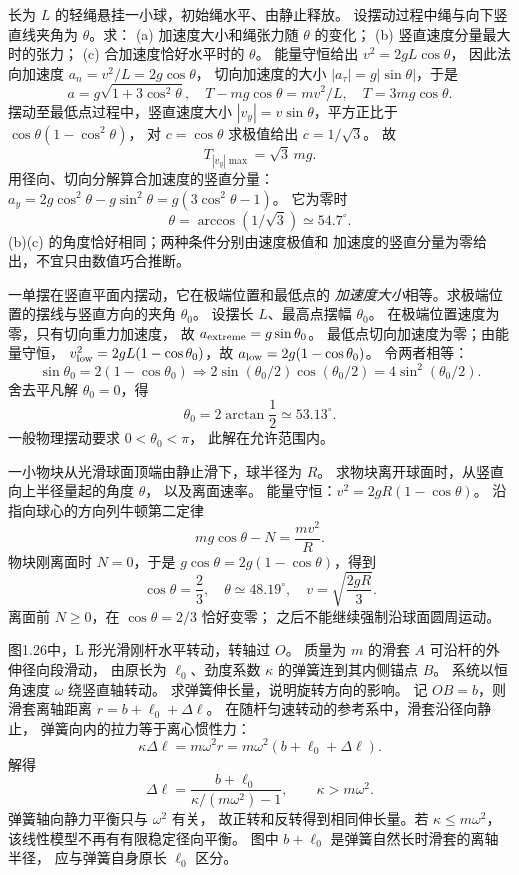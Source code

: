 长为 $L$ 的轻绳悬挂一小球，初始绳水平、由静止释放。
设摆动过程中绳与向下竖直线夹角为 $\theta$。求：
(a) 加速度大小和绳张力随 $\theta$ 的变化；
(b) 竖直速度分量最大时的张力；
(c) 合加速度恰好水平时的 $\theta$。
\exsolution
能量守恒给出 $v^2=2gL\cos\theta$，
因此法向加速度 $a_n=v^2/L=2g\cos\theta$，
切向加速度的大小 $|a_\tau|=g|\sin\theta|$，于是
\[
\boxed{a=g\sqrt{1+3\cos^2\theta},\quad
T-mg\cos\theta=mv^2/L,\quad T=3mg\cos\theta.}
\]
摆动至最低点过程中，竖直速度大小
$|v_y|=v\sin\theta$，平方正比于
$\cos\theta(1-\cos^2\theta)$，
对 $c=\cos\theta$ 求极值给出 $c=1/\sqrt3$。
故
\[
\boxed{T_{|v_y|\max}=\sqrt3\,mg}.
\]
用径向、切向分解算合加速度的竖直分量：
$a_y=2g\cos^2\theta-g\sin^2\theta
=g(3\cos^2\theta-1)$。
它为零时
\[
\boxed{\theta=\arccos(1/\sqrt3)\simeq54.7^\circ}.
\]
\excheck (b)(c) 的角度恰好相同；两种条件分别由速度极值和
加速度的竖直分量为零给出，不宜只由数值巧合推断。

一单摆在竖直平面内摆动，它在极端位置和最低点的
\emph{加速度大小}相等。求极端位置的摆线与竖直方向的夹角 $\theta_0$。
\exsolution
设摆长 $L$、最高点摆幅 $\theta_0$。
在极端位置速度为零，只有切向重力加速度，
故 $a_{\rm extreme}=g\sin\theta_0$。
最低点切向加速度为零；由能量守恒，
$v_{\rm low}^2=2gL(1-\cos\theta_0)$，故
$a_{\rm low}=2g(1-\cos\theta_0)$。
令两者相等：
\[
\sin\theta_0=2(1-\cos\theta_0)
\Longrightarrow
2\sin(\theta_0/2)\cos(\theta_0/2)
=4\sin^2(\theta_0/2).
\]
舍去平凡解 $\theta_0=0$，得
\[
\boxed{\theta_0=2\arctan\frac12\simeq53.13^\circ}.
\]
\excheck 一般物理摆动要求 $0<\theta_0<\pi$，
此解在允许范围内。

一小物块从光滑球面顶端由静止滑下，球半径为 $R$。
求物块离开球面时，从竖直向上半径量起的角度 $\theta$，
以及离面速率。
\exsolution
能量守恒：$v^2=2gR(1-\cos\theta)$。
沿指向球心的方向列牛顿第二定律
\[
mg\cos\theta-N=\frac{mv^2}{R}.
\]
物块刚离面时 $N=0$，于是
$g\cos\theta=2g(1-\cos\theta)$，得到
\[
\boxed{\cos\theta=\frac23,\quad
\theta\simeq48.19^\circ,\quad
v=\sqrt{\frac{2gR}{3}}}.
\]
\excheck 离面前 $N\ge0$，在 $\cos\theta=2/3$ 恰好变零；
之后不能继续强制沿球面圆周运动。

图1.26中，L 形光滑刚杆水平转动，转轴过 $O$。
质量为 $m$ 的滑套 $A$ 可沿杆的外伸径向段滑动，
由原长为 $\ell_0$、劲度系数 $\kappa$ 的弹簧连到其内侧锚点 $B$。
系统以恒角速度 $\omega$ 绕竖直轴转动。
求弹簧伸长量，说明旋转方向的影响。
\exsolution
记 $OB=b$，则滑套离轴距离
$r=b+\ell_0+\Delta\ell$。
在随杆匀速转动的参考系中，滑套沿径向静止，
弹簧向内的拉力等于离心惯性力：
\[
\kappa\Delta\ell=m\omega^2r
=m\omega^2(b+\ell_0+\Delta\ell).
\]
解得
\[
\boxed{\Delta\ell=
\frac{b+\ell_0}{\kappa/(m\omega^2)-1}},
\qquad \kappa>m\omega^2.
\]
\excheck 弹簧轴向静力平衡只与 $\omega^2$ 有关，
故正转和反转得到相同伸长量。若 $\kappa\le m\omega^2$，
该线性模型不再有有限稳定径向平衡。
图中 $b+\ell_0$ 是弹簧自然长时滑套的离轴半径，
应与弹簧自身原长 $\ell_0$ 区分。

